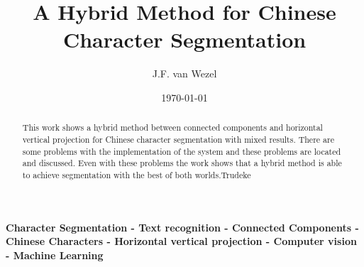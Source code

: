 \documentclass[a4paper]{article}
\title{A Hybrid Method for Chinese Character Segmentation}
\author{J.F. van Wezel}
\affil{University of Groningen}
\date{\today}
\begin{document}
\maketitle


\begin{abstract}
   This work shows a hybrid method between connected components and horizontal vertical projection for Chinese character segmentation with mixed results. There are some problems with the implementation of the system and these problems are located and discussed. Even with these problems the work shows that a hybrid method is able to achieve segmentation with the best of both worlds.Trudeke
\end{abstract}

\smallskip
\noindent \textbf{Character Segmentation - Text recognition - Connected Components - Chinese Characters - Horizontal vertical projection - Computer vision - Machine Learning}









\newpage



\end{document}
